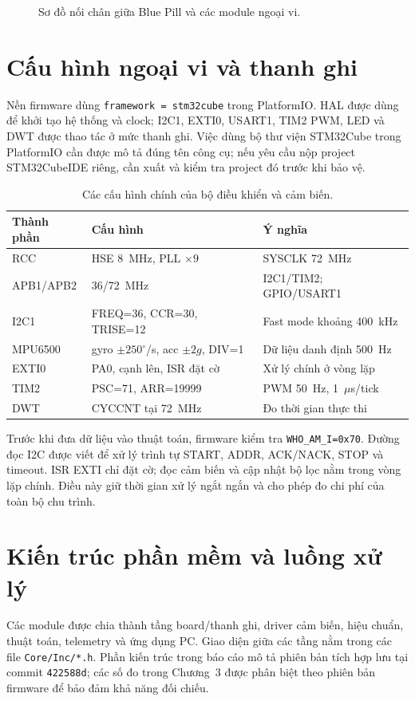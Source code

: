 \documentclass[14pt,a4paper,oneside]{extreport}
\newcommand{\degree}{\ensuremath{^{\circ}}}
\begin{document}
\begin{figure}[htbp]\centering

\caption{Sơ đồ nối chân giữa Blue Pill và các module ngoại vi.}\label{fig:wiring}
\end{figure}

\section{Cấu hình ngoại vi và thanh ghi}
Nền firmware dùng \texttt{framework = stm32cube} trong PlatformIO. HAL được dùng để khởi tạo hệ thống và clock; I2C1, EXTI0, USART1, TIM2 PWM, LED và DWT được thao tác ở mức thanh ghi. Việc dùng bộ thư viện STM32Cube trong PlatformIO cần được mô tả đúng tên công cụ; nếu yêu cầu nộp project STM32CubeIDE riêng, cần xuất và kiểm tra project đó trước khi bảo vệ.

\begin{table}[htbp]\centering\fontsize{12}{17}\selectfont
\caption{Các cấu hình chính của bộ điều khiển và cảm biến.}\label{tab:config}
\begin{tabular}{|L{36mm}|L{48mm}|L{60mm}|}
\hline Thành phần & Cấu hình & Ý nghĩa\\ \hline
RCC & HSE 8~MHz, PLL $\times9$ & SYSCLK 72~MHz\\ \hline
APB1/APB2 & 36/72~MHz & I2C1/TIM2; GPIO/USART1\\ \hline
I2C1 & FREQ=36, CCR=30, TRISE=12 & Fast mode khoảng 400~kHz\\ \hline
MPU6500 & gyro $\pm250\degree$/s, acc $\pm2g$, DIV=1 & Dữ liệu danh định 500~Hz\\ \hline
EXTI0 & PA0, cạnh lên, ISR đặt cờ & Xử lý chính ở vòng lặp\\ \hline
TIM2 & PSC=71, ARR=19999 & PWM 50~Hz, 1~$\mu$s/tick\\ \hline
DWT & CYCCNT tại 72~MHz & Đo thời gian thực thi\\ \hline
\hline
\end{tabular}
\end{table}

Trước khi đưa dữ liệu vào thuật toán, firmware kiểm tra \texttt{WHO\_AM\_I=0x70}. Đường đọc I2C được viết để xử lý trình tự START, ADDR, ACK/NACK, STOP và timeout. ISR EXTI chỉ đặt cờ; đọc cảm biến và cập nhật bộ lọc nằm trong vòng lặp chính. Điều này giữ thời gian xử lý ngắt ngắn và cho phép đo chi phí của toàn bộ chu trình.

\section{Kiến trúc phần mềm và luồng xử lý}
Các module được chia thành tầng board/thanh ghi, driver cảm biến, hiệu chuẩn, thuật toán, telemetry và ứng dụng PC. Giao diện giữa các tầng nằm trong các file \texttt{Core/Inc/*.h}. Phần kiến trúc trong báo cáo mô tả phiên bản tích hợp lưu tại commit \texttt{422588d}; các số đo trong Chương~3 được phân biệt theo phiên bản firmware để bảo đảm khả năng đối chiếu.
\end{document}
